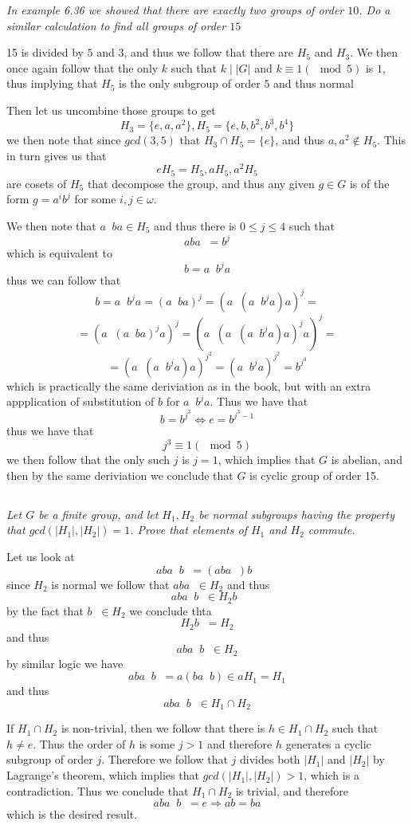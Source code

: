 \documentclass[11pt,oneside,titlepage]{book}
\DeclareMathOperator \inv {^{-1}}
\DeclareMathOperator \lra {\Leftrightarrow}
\DeclareMathOperator \ra {\Rightarrow}
\newcommand{\set}[1]{\{ #1 \}}
\begin{document}
\textit{In example 6.36 we showed that there are exactly two groups of
  order $10$. Do a similar calculation to find all groups of order $15$}

15 is divided by $5$ and $3$, and thus we follow that there are $H_5$
and $H_3$. We then once again follow that the only $k$ such that
$k \mid |G|$ and $k \equiv 1 (\mod 5)$ is $1$, thus implying that
$H_5$ is the only subgroup of order $5$ and thus normal

Then let us uncombine those groups to get
$$H_3 = \set{e, a, a^2}, H_5 = \set{e, b, b^2, b^3, b^4}$$
we then note that since $gcd(3, 5)$ that $H_3 \cap H_5 = \set{e}$,
and thus $a, a^2 \notin H_5$. This in turn gives us that
$$eH_5 = H_5, aH_5, a^2H_5$$
are cosets of $H_5$ that decompose the group, and thus any given
$g \in G$ is of the form $g = a^ib^j$ for some $i, j \in \omega$.

We then note that $a\inv ba \in H_5$ and thus there is $0 \leq j \leq 4$
such that
$$a b a\inv = b^j$$
which is equivalent to
$$b = a\inv b^j a$$
thus we can follow that
$$b = a\inv b^j a = (a\inv b a)^j = (a\inv (a\inv b^j a) a)^j = $$
$$ = (a\inv (a\inv b a)^j a)^j = (a\inv (a\inv (a\inv b^j a) a)^j a)^j = $$
$$ = (a\inv (a\inv b^j a) a)^{j^2} = (a\inv b^j a)^{j^2} = b^{j^3}$$
which is practically the same deriviation as in the book, but with an
extra appplication of substitution of $b$ for $a\inv b^j a$.
Thus we have that
$$b = b^{j^3} \lra e = b^{j^3 - 1}$$
thus we have that
$$j^3 \equiv 1 (\mod 5)$$
we then follow that the only such $j$ is $j = 1$, which implies that
$G$ is abelian, and then by the same deriviation we conclude that $G$
is cyclic group of order 15. 

\subsection{}

\textit{Let $G$ be a finite group, and let $H_1, H_2$ be normal subgroups
  having the property that $gcd(|H_1|, |H_2|) = 1$. Prove that elements
  of $H_1$ and $H_2$ commute.}

Let us look at
$$aba\inv b\inv = (a b a\inv) b\inv $$
since $H_2$ is normal we follow that $aba\inv \in H_2$ and thus
$$aba\inv b\inv \in H_2 b\inv$$
by the fact that $b\inv \in H_2$ we conclude thta
$$H_2 b\inv = H_2$$
and thus
$$aba\inv b\inv \in H_2$$
by similar logic we have
$$aba\inv b\inv = a(ba\inv b) \in a H_1 = H_1$$
and thus
$$aba\inv b\inv \in H_1 \cap H_2$$

If $H_1 \cap H_2$ is non-trivial, then we follow that there is $h \in
H_1 \cap H_2$ such that $h \neq e$. Thus the order of $h$ is some
$j > 1$ and therefore $h$ generates a cyclic subgroup of
order $j$. Therefore we follow that $j$ divides both $|H_1|$
and $|H_2|$ by Lagrange's theorem, which implies that
$gcd(|H_1|, |H_2|) > 1$, which is a contradiction. Thus we conclude that
$H_1 \cap H_2$ is trivial, and therefore
$$aba\inv b\inv = e \ra ab = ba$$
which is the desired result.
\end{document}
